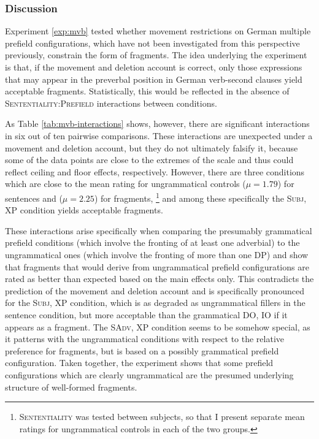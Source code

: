 \subsubsection{Discussion}\label{sec:mvb-discussion}
Experiment \ref{exp:mvb} tested whether movement restrictions on German multiple prefield configurations, which have not been investigated from this perspective previously, constrain the form of fragments. The idea underlying the experiment is that, if the movement and deletion account is correct, only those expressions that may appear in the preverbal position in German verb-second clauses yield acceptable fragments. Statistically, this would be reflected in the absence of \textsc{Sententiality:Prefield} interactions between conditions.

As Table \ref{tab:mvb-interactions} shows, however, there are significant interactions in six out of ten pairwise comparisons. These interactions are unexpected under a movement and deletion account, but they do not ultimately falsify it, because some of the data points are close to the extremes of the scale and thus could reflect ceiling and floor effects, respectively. However, there are three conditions which are close to the mean rating for ungrammatical controls ($\mu = 1.79$) for sentences and ($\mu = 2.25$) for fragments,%
\footnote{\textsc{Sententiality} was tested between subjects, so that I present separate mean ratings for ungrammatical controls in each of the two groups.}\afterfn%
%
and among these specifically the \textsc{Subj, XP} condition yields acceptable fragments.

These interactions arise specifically when comparing the presumably grammatical prefield conditions (which involve the fronting of at least one adverbial) to the ungrammatical ones (which involve the fronting of more than one DP) and show that fragments that \citet{merchant2004} would derive from ungrammatical prefield configurations are rated as better than expected based on the main effects only. This contradicts the prediction of the movement and deletion account and is specifically pronounced for the \textsc{Subj, XP} condition, which is as degraded as ungrammatical fillers in the sentence condition, but more acceptable than the grammatical \textsc{DO, IO} if it appears as a fragment. The \textsc{SAdv, XP} condition seems to be somehow special, as it patterns with the ungrammatical conditions with respect to the relative preference for fragments, but is based on a possibly grammatical prefield configuration. Taken together, the experiment shows that some prefield configurations which are clearly ungrammatical are the presumed underlying structure of well-formed fragments.

